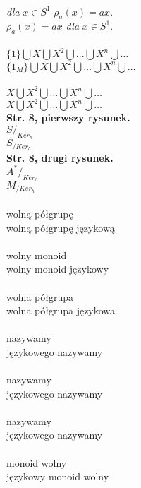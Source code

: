 \documentclass[a4paper,11pt]{article}
\begin{document}
\noindent
{} \\
\Jest  \textit{dla} $x \in S^{ 1 }$ $\rho_{ a }( x )= a x$. \\
\Powin $\rho_{ a }( x ) = a x$ \textit{dla} $x \in S^{ 1 }$. \\
 \\
\Jest  $\{ 1 \} \bigcup X \bigcup X^{ 2 } \bigcup ... \bigcup X^{ n } \bigcup \ldots$ \\
\Powin $\{ 1_{ M } \} \bigcup X \bigcup X^{ 2 } \bigcup \ldots \bigcup X^{ n } \bigcup \ldots$ \\
 \\
\Jest  $X \bigcup X^{ 2 } \bigcup ... \bigcup X^{ n } \bigcup \ldots$ \\
\Powin $X \bigcup X^{ 2 } \bigcup \ldots \bigcup X^{ n } \bigcup \ldots$ \\
\textbf{Str. 8, pierwszy rysunek.} \\
\Jest  $S /_{ Ker_{ h } }$ \\
\Powin $S_{ / Ker_{ h } }$ \\
\textbf{Str. 8, drugi rysunek.} \\
\Jest  $A^{ * } /_{ Ker_{ h } }$ \\
\Powin $M_{ / Ker_{ h } }$ \\
 \\
\Jest  wolną półgrupę \\
\Powin wolną półgrupę językową \\
 \\
\Jest  wolny monoid \\
\Powin wolny monoid językowy \\
 \\
\Jest  wolna półgrupa \\
\Powin wolna półgrupa językowa \\
 \\
\Jest  nazywamy \\
\Powin językowego nazywamy \\
 \\
\Jest  nazywamy \\
\Powin językowego nazywamy \\
 \\
\Jest  nazywamy \\
\Powin językowego nazywamy \\
 \\
\Jest  monoid wolny \\
\Powin językowy monoid wolny \\
\end{document}
